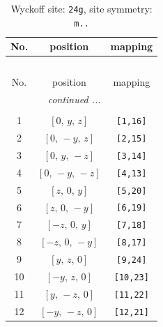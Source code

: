 \documentclass[fleqn,8pt]{jsarticle}
\begin{document}
\renewcommand{\arraystretch}{1.2}
\begin{longtable}{ccc}
\caption{Wyckoff site: {\tt 24g}, site symmetry: {\tt m..}}
 \\
 \hline \hline
No. & position & mapping \\ \hline \endfirsthead

\multicolumn{2}{l}{\tablename\ \thetable{}} \\
 \hline \hline
No. & position & mapping \\ \hline \endhead

 \hline \hline
\multicolumn{2}{r}{\footnotesize\it continued ...} \\ \endfoot

 \hline \hline
\multicolumn{2}{r}{} \\ \endlastfoot

1 & $\left[ 0,\, y,\, z \right]$ & {\tt [1,16]} \\ \hline
2 & $\left[ 0,\, - y,\, z \right]$ & {\tt [2,15]} \\ \hline
3 & $\left[ 0,\, y,\, - z \right]$ & {\tt [3,14]} \\ \hline
4 & $\left[ 0,\, - y,\, - z \right]$ & {\tt [4,13]} \\ \hline
5 & $\left[ z,\, 0,\, y \right]$ & {\tt [5,20]} \\ \hline
6 & $\left[ z,\, 0,\, - y \right]$ & {\tt [6,19]} \\ \hline
7 & $\left[ - z,\, 0,\, y \right]$ & {\tt [7,18]} \\ \hline
8 & $\left[ - z,\, 0,\, - y \right]$ & {\tt [8,17]} \\ \hline
9 & $\left[ y,\, z,\, 0 \right]$ & {\tt [9,24]} \\ \hline
10 & $\left[ - y,\, z,\, 0 \right]$ & {\tt [10,23]} \\ \hline
11 & $\left[ y,\, - z,\, 0 \right]$ & {\tt [11,22]} \\ \hline
12 & $\left[ - y,\, - z,\, 0 \right]$ & {\tt [12,21]} \\
\end{longtable}
\renewcommand{\arraystretch}{1.2}
\end{document}
